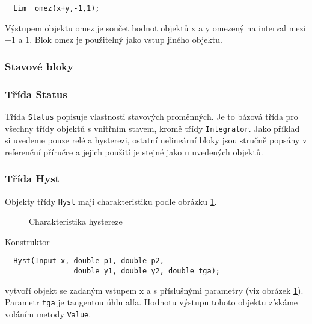 \documentclass[a4paper]{article}
\begin{document}
\begin{verbatim}
  Lim  omez(x+y,-1,1);
\end{verbatim}

Výstupem objektu omez je součet hodnot objektů x a y omezený na
interval mezi $-1$ a $1$. Blok omez je použitelný jako vstup jiného
objektu.


\subsubsection{Stavové bloky}

\subsubsection*{Třída Status}

Třída \verb|Status| popisuje vlastnosti stavových proměnných. Je to
bázová třída pro všechny třídy objektů s vnitřním stavem, kromě
třídy \verb|Integrator|. Jako příklad si uvedeme pouze relé
a hysterezi, ostatní nelineární bloky jsou stručně popsány
v referenční příručce a jejich použití je stejné jako
u uvedených objektů.

\subsubsection*{Třída  Hyst}

Objekty třídy  \verb|Hyst|  mají charakteristiku podle obrázku \ref{o6}.

\begin{figure}[ht]
  \begin{center}
    \caption{Charakteristika hystereze}
    \label{o6}
  \end{center}
\end{figure}


Konstruktor

\begin{verbatim}
  Hyst(Input x, double p1, double p2, 
                double y1, double y2, double tga);
\end{verbatim}

vytvoří objekt se zadaným vstupem x a s příslušnými parametry
(viz obrázek \ref{o6}). Parametr \verb|tga| je tangentou úhlu alfa. Hodnotu
výstupu tohoto objektu získáme voláním metody \verb|Value|.
\end{document}
